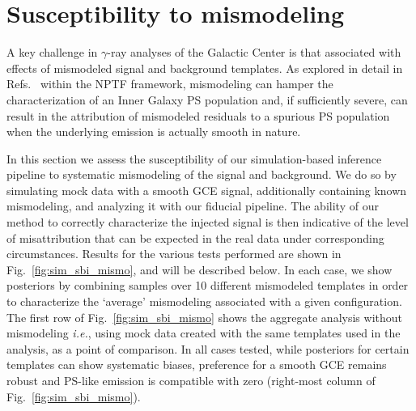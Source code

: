 \documentclass[prd,aps,10pt,nofootinbib,twocolumn,superscriptaddress,preprintnumbers,balancelastpage,longbibliography]{revtex4-1}
\begin{document}

\section{Susceptibility to mismodeling}
\label{sec:mismodeling}

A key challenge in $\gamma$-ray analyses of the Galactic Center is that associated with effects of mismodeled signal and background templates. As explored in detail in Refs.~\cite{Lee:2015fea,Leane:2020pfc,Leane:2020nmi,Buschmann:2020adf,Chang:2019ars} within the NPTF framework, mismodeling can hamper the characterization of an Inner Galaxy PS population and, if sufficiently severe, can result in the attribution of mismodeled residuals to a spurious PS population when the underlying emission is actually smooth in nature. 

In this section we assess the susceptibility of our simulation-based inference pipeline to systematic mismodeling of the signal and background. We do so by simulating mock data with a smooth GCE signal, additionally containing known mismodeling, and analyzing it with our fiducial pipeline. The ability of our method to correctly characterize the injected signal is then indicative of the level of misattribution that can be expected in the real data under corresponding circumstances. Results for the various tests performed are shown in Fig.~\ref{fig:sim_sbi_mismo}, and will be described below. In each case, we show posteriors by combining samples over 10 different mismodeled templates in order to characterize the `average' mismodeling associated with a given configuration. The first row of Fig.~\ref{fig:sim_sbi_mismo} shows the aggregate analysis without mismodeling \emph{i.e.}, using mock data created with the same templates used in the analysis, as a point of comparison. In all cases tested, while posteriors for certain templates can show systematic biases, preference for a smooth GCE remains robust and PS-like emission is compatible with zero (right-most column of Fig.~\ref{fig:sim_sbi_mismo}). \\
\end{document}
